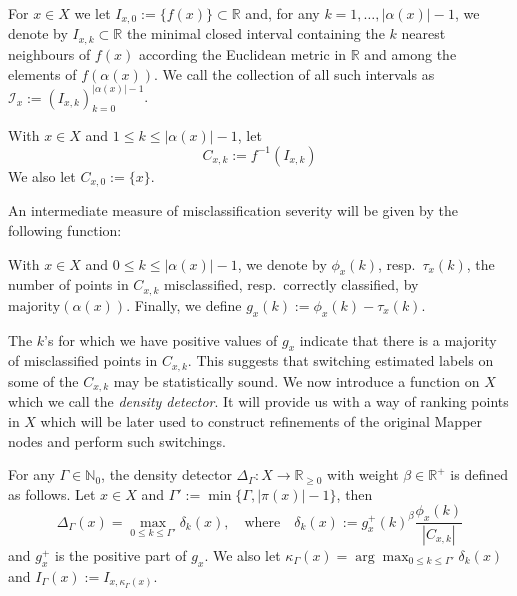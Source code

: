 For $x \in X$ we let $I_{x, 0} := \{ f(x) \} \subset \mathbb R$ and, for any $k=1, \ldots, |\alpha(x)| - 1$, we denote by $I_{x, k}\subset \mathbb R$ the minimal closed interval containing the $k$ nearest neighbours of $f(x)$ according the Euclidean metric in $\mathbb{R}$ and among the elements of $f(\alpha(x))$. We call the collection of all such intervals as $\mathcal{I}_x := (I_{x, k})_{k=0}^{|\alpha(x)|-1}$.


\begin{definition}
	With $x \in X$ and $1 \leq k \leq |\alpha(x)|-1 $, let 
	$$ C_{x,k} := f^{-1}(I_{x,k})$$
	We also let $C_{x,0}:=\{x \}$.
\end{definition}
An intermediate measure of misclassification severity will be given by the following function: 
\begin{definition}
	With $x \in X$ and $0 \leq k \leq |\alpha(x)|-1 $, we denote by $\phi_x(k)$, resp.\ $\tau_x(k)$, the number of points in $C_{x,k}$ misclassified, resp.\ correctly classified, by $\mathrm{majority}(\alpha(x))$.  Finally, we define $g_x(k):=\phi_x(k) - \tau_x(k)$.
\end{definition} 

The $k$'s for which we have positive values of $g_x$ indicate that there is a majority of misclassified points in $C_{x,k}$.  This suggests that switching estimated labels on some of the $C_{x,k}$ may be statistically sound. We now introduce a function on $X$ which we call the \emph{density detector}. It will provide us with a way of ranking points in $X$ which will be later used to construct refinements of the original Mapper nodes and perform such switchings.

\begin{definition}\label{def: delta}
	For any $\Gamma \in \mathbb{N}_0$, the density detector $\Delta_\Gamma : X \rightarrow \mathbb R_{\geq 0}$ with weight $\beta \in \mathbb R^+$ is defined as follows.  Let $x \in X$ and $\Gamma' := \min\{ \Gamma, |\pi(x)| - 1\}$, then
	\begin{equation*}
	\Delta_\Gamma (x)= \max\limits_{0 \leq k \leq \Gamma'} \delta_k(x), \quad \text{where} \quad \delta_k(x) := g_x^+(k)^{\beta} \frac{\phi_x(k)}{|C_{x,k}|}
	\end{equation*}
	and $g_x^+$ is the positive part of $g_x$.  We also let $\kappa_\Gamma(x) = \arg \max_{0 \leq k \leq \Gamma'}\delta_k(x)$ and $I_\Gamma(x) := I_{x, \kappa_\Gamma(x)}$.
\end{definition}

